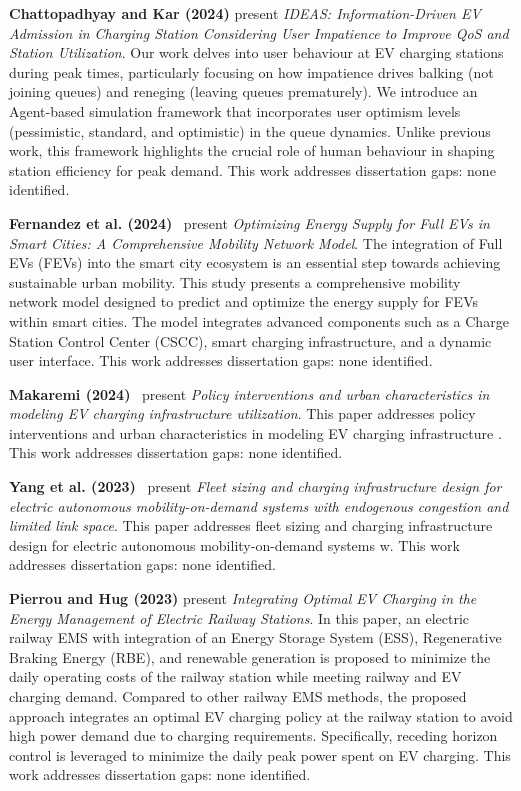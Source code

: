 \documentclass[letterpaper, 12pt, oneside, doublespacing]{Thesis}
\begin{document}
\noindent \textbf{Chattopadhyay and Kar (2024)} present \textit{IDEAS: Information-Driven EV Admission in Charging Station Considering User Impatience to Improve QoS and Station Utilization}. Our work delves into user behaviour at EV charging stations during peak times, particularly focusing on how impatience drives balking (not joining queues) and reneging (leaving queues prematurely). We introduce an Agent-based simulation framework that incorporates user optimism levels (pessimistic, standard, and optimistic) in the queue dynamics. Unlike previous work, this framework highlights the crucial role of human behaviour in shaping station efficiency for peak demand. This work addresses dissertation gaps: none identified.



\noindent \textbf{Fernandez et al. (2024)}~\cite{optimizing_energy_2024} present \textit{Optimizing Energy Supply for Full EVs in Smart Cities: A Comprehensive Mobility Network Model}. The integration of Full EVs (FEVs) into the smart city ecosystem is an essential step towards achieving sustainable urban mobility. This study presents a comprehensive mobility network model designed to predict and optimize the energy supply for FEVs within smart cities. The model integrates advanced components such as a Charge Station Control Center (CSCC), smart charging infrastructure, and a dynamic user interface. This work addresses dissertation gaps: none identified.



\noindent \textbf{Makaremi (2024)}~\cite{policy_interventions_2024} present \textit{Policy interventions and urban characteristics in modeling EV charging infrastructure utilization}. This paper addresses policy interventions and urban characteristics in modeling EV charging infrastructure . This work addresses dissertation gaps: none identified.



\noindent \textbf{Yang et al. (2023)}~\cite{fleet_sizing_2023} present \textit{Fleet sizing and charging infrastructure design for electric autonomous mobility-on-demand systems with endogenous congestion and limited link space}. This paper addresses fleet sizing and charging infrastructure design for electric autonomous mobility-on-demand systems w. This work addresses dissertation gaps: none identified.



\noindent \textbf{Pierrou and Hug (2023)} present \textit{Integrating Optimal EV Charging in the Energy Management of Electric Railway Stations}. In this paper, an electric railway EMS with integration of an Energy Storage System (ESS), Regenerative Braking Energy (RBE), and renewable generation is proposed to minimize the daily operating costs of the railway station while meeting railway and EV charging demand. Compared to other railway EMS methods, the proposed approach integrates an optimal EV charging policy at the railway station to avoid high power demand due to charging requirements. Specifically, receding horizon control is leveraged to minimize the daily peak power spent on EV charging. This work addresses dissertation gaps: none identified.
\end{document}
